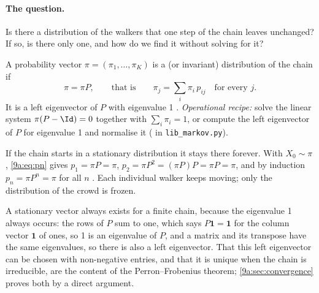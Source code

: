 \paragraph{The question.} Is there a distribution of the walkers that one step of the chain
leaves unchanged? If so, is there only one, and how do we find it without solving for it?

\begin{workdef}
A probability vector $\pi=(\pi_1,\dots,\pi_K)$ 
is a  (or invariant) distribution of the chain if
\begin{equation}
  \pi=\pi P,\qquad\text{that is}\qquad \pi_j=\sum_i\pi_i\,p_{ij}\quad\text{for every }j .
  \label{9a:eq:stationary}
\end{equation}
It is a left eigenvector of $P$ with eigenvalue 1 .
\emph{Operational recipe:} solve the linear system $\pi(P-\Id)=0$ together with
$\sum_i\pi_i=1$, or compute the left eigenvector of $P$ for eigenvalue 1 and normalise it
( in \texttt{lib\_markov.py}).
\end{workdef}

If the chain starts in a stationary distribution it stays there forever. With $X_0\sim\pi$,
\eqref{9a:eq:pn} gives $p_1=\pi P=\pi$, $p_2=\pi P^2=(\pi P)P=\pi P=\pi$, and by induction
$p_n=\pi P^n=\pi$ for all $n$ . Each individual walker keeps moving; only the
distribution of the crowd is frozen.

A stationary vector always exists for a finite chain, because the eigenvalue 1 always occurs:
the rows of $P$ sum to one, which says $P\mathbf1=\mathbf1$ for the column vector $\mathbf1$ of
ones, so 1 is an eigenvalue of $P$, and a matrix and its transpose have the same eigenvalues,
so there is also a left eigenvector. That this left eigenvector can be chosen with non-negative
entries, and that it is unique when the chain is irreducible, are the content of the
Perron--Frobenius theorem; \cref{9a:sec:convergence} proves both by a direct argument.

